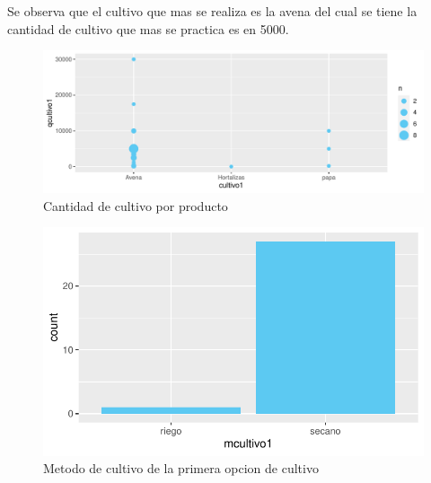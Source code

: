 \documentclass[12pt]{article}\usepackage[]{graphicx}\usepackage[]{xcolor}
\makeatletter
\def\maxwidth{ %
  \ifdim\Gin@nat@width>\linewidth
    \linewidth
  \else
    \Gin@nat@width
  \fi
}
\newenvironment{kframe}{%
 \def\at@end@of@kframe{}%
 \ifinner\ifhmode%
  \def\at@end@of@kframe{\end{minipage}}%
  \begin{minipage}{\columnwidth}%
 \fi\fi%
 \def\FrameCommand##1{\hskip\@totalleftmargin \hskip-\fboxsep
 \colorbox{shadecolor}{##1}\hskip-\fboxsep
     \hskip-\linewidth \hskip-\@totalleftmargin \hskip\columnwidth}%
 \MakeFramed {\advance\hsize-\width
   \@totalleftmargin\z@ \linewidth\hsize
   \@setminipage}}%
 {\par\unskip\endMakeFramed%
 \at@end@of@kframe}
\newenvironment{knitrout}{}{} %
\makeatother
\begin{document}
	Se observa que el cultivo que mas se realiza es la avena del cual se tiene la cantidad de cultivo que mas se practica es en 5000.
	\begin{figure}[H]
	\centering
\begin{knitrout}
\color{fgcolor}\begin{kframe}


{\ttfamily\noindent\color{warningcolor}{\#\# Warning: NAs introducidos por coerción}}\end{kframe}
\includegraphics[width=\maxwidth]{figure/oneh-1} 
\end{knitrout}
	\caption{Cantidad de cultivo por producto}
	\end{figure}
	
	\begin{figure}[H]
	\centering
\begin{knitrout}
\color{fgcolor}
\includegraphics[width=\maxwidth]{figure/twelve-1} 
\end{knitrout}
	\caption{Metodo de cultivo de la primera opcion de cultivo}
	\end{figure}
	
\end{document}
